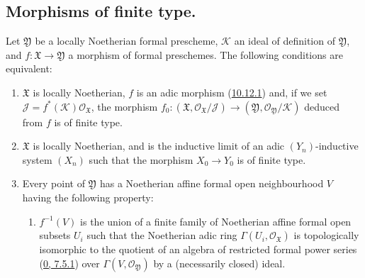 \subsection{Morphisms of finite type.}
\label{subsection:I.10.13}

\begin{proposition}[10.13.1]
\label{I.10.13.1}
Let $\mathfrak{Y}$ be a locally Noetherian formal prescheme,
$\mathscr{K}$ an ideal of definition of $\mathfrak{Y}$, and
$f:\mathfrak{X}\to\mathfrak{Y}$ a morphism of formal preschemes. The
following conditions are equivalent:
\begin{enumerate}
  \item[a)] $\mathfrak{X}$ is locally Noetherian, $f$ is an adic morphism
    (\hyperref[I.10.12.1]{10.12.1}) and, if we set
    $\mathscr{J}=f^*(\mathscr{K})\mathscr{O}_{\mathfrak{X}}$, the morphism
    $f_0:(\mathfrak{X},\mathscr{O}_{\mathfrak{X}}/\mathscr{J})
    \to(\mathfrak{Y},\mathscr{O}_{\mathfrak{Y}}/\mathscr{K})$ deduced from
    $f$ is of finite type.
  \item[b)] $\mathfrak{X}$ is locally Noetherian, and is the inductive
    limit of an adic $(Y_n)$-inductive system $(X_n)$ such that the
    morphism $X_0\to Y_0$ is of finite type.


  \item[c)] Every point of $\mathfrak{Y}$ has a Noetherian affine formal
    open neighbourhood $V$ having the following property:
    \begin{enumerate}
      \item[(\textbf{Q})] $f^{-1}(V)$ is the union of a finite family
        of Noetherian affine formal open subsets $U_i$ such that the
        Noetherian adic ring $\Gamma(U_i,\mathscr{O}_{\mathfrak{X}})$ is
        topologically isomorphic to the quotient of an algebra of restricted
        formal power series (\hyperref[0.7.5.1]{0, 7.5.1}) over
        $\Gamma(V,\mathscr{O}_{\mathfrak{Y}})$ by a (necessarily
        closed) ideal.
    \end{enumerate}
\end{enumerate}
\end{proposition}

